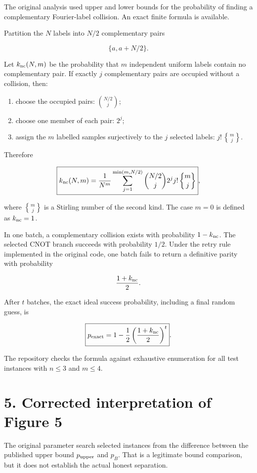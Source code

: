 \documentclass[
  10pt,
]{article}
\providecommand{\tightlist}{%
  \setlength{\itemsep}{0pt}\setlength{\parskip}{0pt}}
\begin{document}
The original analysis used upper and lower bounds for the probability of
finding a complementary Fourier-label collision. An exact finite formula
is available.

Partition the \(N\) labels into \(N/2\) complementary pairs

\[
\{a,a+N/2\}.
\]

Let \(k_{\rm nc}(N,m)\) be the probability that \(m\) independent
uniform labels contain no complementary pair. If exactly \(j\)
complementary pairs are occupied without a collision, then:

\begin{enumerate}
\def\labelenumi{\arabic{enumi}.}
\tightlist
\item
  choose the occupied pairs: \(\binom{N/2}{j}\);
\item
  choose one member of each pair: \(2^j\);
\item
  assign the \(m\) labelled samples surjectively to the \(j\) selected
  labels: \(j!\,{m\brace j}\).
\end{enumerate}

Therefore

\[
\boxed{
k_{\rm nc}(N,m)
=
\frac1{N^m}
\sum_{j=1}^{\min(m,N/2)}
\binom{N/2}{j}
2^j j!\,{m\brace j}
},
\]

where \({m\brace j}\) is a Stirling number of the second kind. The case
\(m=0\) is defined as \(k_{\rm nc}=1\).

In one batch, a complementary collision exists with probability
\(1-k_{\rm nc}\). The selected CNOT branch succeeds with probability
\(1/2\). Under the retry rule implemented in the original code, one
batch fails to return a definitive parity with probability

\[
\frac{1+k_{\rm nc}}2.
\]

After \(t\) batches, the exact ideal success probability, including a
final random guess, is

\[
\boxed{
p_{\rm exact}
=
1-\frac12
\left(\frac{1+k_{\rm nc}}2\right)^t
}.
\]

The repository checks the formula against exhaustive enumeration for all
test instances with \(n\le3\) and \(m\le4\).

\section{5. Corrected interpretation of Figure
5}\label{corrected-interpretation-of-figure-5}

The original parameter search selected instances from the difference
between the published upper bound \(p_{\rm upper}\) and \(p_B\). That is
a legitimate bound comparison, but it does not establish the actual
honest separation.
\end{document}
